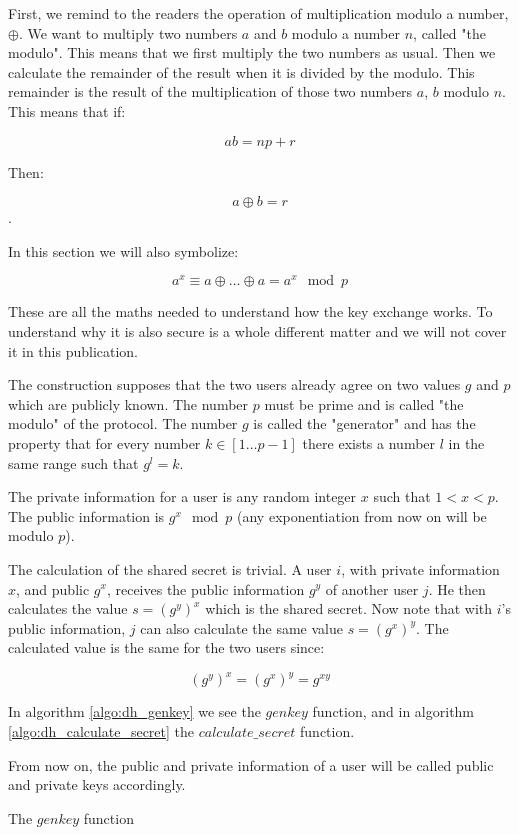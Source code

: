 First, we remind to the readers the operation of multiplication modulo a number, $\oplus$.
We want to multiply two numbers $a$ and $b$ modulo a number $n$, called "the modulo".
This means that we first multiply the two numbers as usual.
Then we calculate the remainder of the result when it is divided by the modulo.
This remainder is the result of the multiplication of those two numbers $a$, $b$ modulo $n$.
This means that if:

\[
  ab = np + r
\]

Then:

\[
  a \oplus b  = r
\]
.

In this section we will also symbolize:

\[
  a^x \equiv a \oplus \dots \oplus a = a^x \mod p
\]

These are all the maths needed to understand how the \dhname key exchange works.
To understand why it is also secure is a whole different matter and we will not cover it in this publication.

The \dhname construction supposes that the two users already agree on two values $g$ and $p$ which are publicly known.
The number $p$ must be prime and is called "the modulo" of the protocol.
The number $g$ is called the "generator" and has the property that for every number $k \in [1 \dots p-1]$ there exists a number $l$ in the same range such that $g^l = k$.

The private information for a user is any random integer $x$ such that $ 1 < x < p$.
The public information is $g^x \mod p$ (any exponentiation from now on will be modulo $p$).

The calculation of the shared secret is trivial.
A user $i$, with private information $x$, and public $g^x$, receives the public information $g^y$ of another user $j$.
He then calculates the value $s = (g^y)^x$ which is the shared secret.
Now note that with $i$'s public information, $j$ can also calculate the same value $s = (g^x)^y$.
The calculated value is the same for the two users since:

\[
  (g^y)^x = (g^x)^y = g^{xy}
\]

In algorithm \ref{algo:dh_genkey} we see the $genkey$ function, and in algorithm \ref{algo:dh_calculate_secret} the $calculate\_secret$ function.

From now on, the public and private information of a user will be called public and private keys accordingly.

\begin{algorithm}[h]
  \caption{The $genkey$ function}
  \label{algo:dh_genkey}
\end{algorithm}

